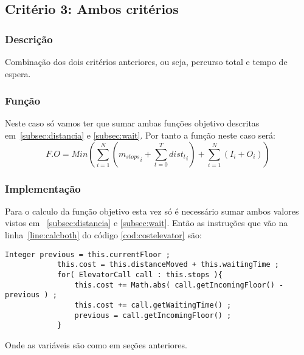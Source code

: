 \subsection{Critério 3: Ambos critérios}
	\label{subsec:both}
	\subsubsection{Descrição}
		Combinação dos dois critérios anteriores, ou seja, percurso total e tempo de espera.
	\subsubsection{Função}
		Neste caso só vamos ter que sumar ambas funções objetivo descritas em~\ref{subsec:distancia} e \ref{subsec:wait}. Por tanto a função neste caso será:
		\[
			F.O = Min( \sum_{i=1}^{N}( {m_{stops}}_i + \sum_{t=0}^{T}{dist_t}_i ) + \sum_{i=1}^{N} ( I_i + O_i ) )
		\]
	\subsubsection{Implementação}
		Para o calculo da função objetivo esta vez só é necessário sumar ambos valores vistos em ~\ref{subsec:distancia} e \ref{subsec:wait}. Então as instruções que vão na linha~\ref{line:calcboth} do código \ref{cod:costelevator} são:
		\begin{lstlisting}[caption = Calculo de custo por percurso e tempo de espera do elevador, label = cod:calcboth]
			Integer previous = this.currentFloor ;
			this.cost = this.distanceMoved + this.waitingTime ;
			for( ElevatorCall call : this.stops ){
				this.cost += Math.abs( call.getIncomingFloor() - previous ) ;
				this.cost += call.getWaitingTime() ;
				previous = call.getIncomingFloor() ;
			}
		\end{lstlisting}
		Onde as variáveis são como em seções anteriores.